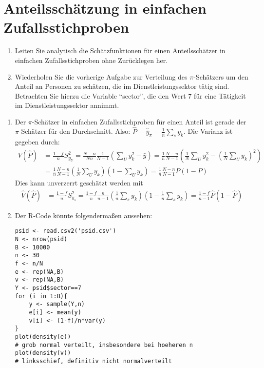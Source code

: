 \documentclass{article}
\begin{document}
\section{Anteilsschätzung in einfachen Zufallsstichproben}
\begin{enumerate}
	\item Leiten Sie analytisch die Schätzfunktionen für einen Anteilsschätzer in einfachen Zufallsstichproben ohne Zurücklegen her.
	\item Wiederholen Sie die vorherige Aufgabe zur Verteilung des $\pi$-Schätzers um den Anteil an Personen zu schätzen, die im Dienstleistungssektor tätig sind. Betrachten Sie hierzu die Variable \enquote{sector}, die den Wert 7 für eine Tätigkeit im Dienstleistungssektor annimmt.
\end{enumerate}
\begin{solution}
	\begin{enumerate}
\item Der $\pi$-Schätzer in einfachen Zufallsstichproben für einen Anteil ist gerade der $\pi$-Schätzer für den Durchschnitt. Also: $\hat{P}=\hat{\bar{y}}_\pi = \frac{1}{n}\sum_s y_k$. Die Varianz ist gegeben durch:
\begin{align*}
V(\hat{P}) &= \frac{1-f}{n} S_{y_U}^2 = \frac{N-n}{Nn}\frac{1}{N-1}\left(\sum_U y_k^2-\bar{y}\right) = \frac{1}{n}\frac{N-n}{N-1}\left(\frac{1}{N}\sum_U y_k^2 - \left(\frac{1}{N}\sum_U y_k\right)^2\right)\\
&=\frac{1}{n}\frac{N-n}{N-1} \left(\frac{1}{N}\sum_U y_k\right)\left(1-\sum_U y_k\right) = \frac{1}{n}\frac{N-n}{N-1} P(1-P)
\end{align*}
Dies kann unverzerrt geschätzt werden mit
\begin{align*}
\hat{V}(\hat{P}) &= \frac{1-f}{n}S_{y_s}^2 = \frac{1-f}{n}\frac{n}{n-1}\left(\frac{1}{n}\sum_s y_k\right)\left(1-\frac{1}{n}\sum_s y_k\right) = \frac{1-f}{n-1}\hat{P}(1-\hat{P})
\end{align*}
\item Der R-Code könnte folgendermaßen aussehen:
\begin{lstlisting}
psid <- read.csv2('psid.csv')
N <- nrow(psid)
B <- 10000
n <- 30
f <- n/N
e <- rep(NA,B)
v <- rep(NA,B)
Y <- psid$sector==7
for (i in 1:B){
	y <- sample(Y,n)
	e[i] <- mean(y)
	v[i] <- (1-f)/n*var(y)
}
plot(density(e))
# grob normal verteilt, insbesondere bei hoeheren n
plot(density(v))
# linksschief, definitiv nicht normalverteilt
\end{lstlisting}
\end{enumerate}
\end{solution}
\end{document}
